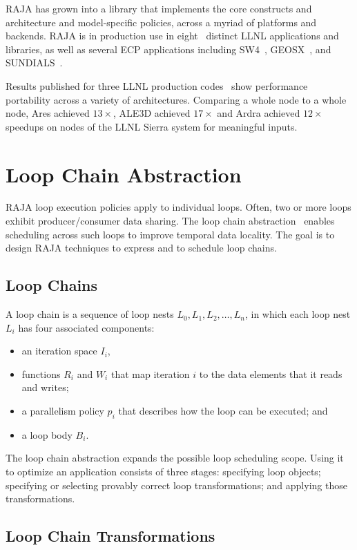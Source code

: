RAJA has grown into a library that implements the core constructs and
architecture and model-specific policies, across a myriad of platforms and
backends. RAJA is in production use in eight~\cite{raja-ecp-report} distinct
LLNL applications and libraries, as well as several ECP applications including
SW4~\cite{sw4}, GEOSX~\cite{geosx}, and SUNDIALS~\cite{sundials}.

Results published for three LLNL production codes~\cite{raja-p3hpc} show
performance portability across a variety of architectures.  Comparing a whole
node to a whole node, Ares achieved $13\times$, ALE3D achieved $17\times$ and
Ardra achieved $12\times$ speedups on nodes of the LLNL Sierra system for
meaningful inputs.


\section{Loop Chain Abstraction}\label{sec:loopchain}
RAJA loop execution policies apply to individual loops.
Often, two or more loops exhibit producer/consumer data sharing.
The loop chain abstraction~\cite{krieger2013loop} enables scheduling
across such loops to improve temporal data locality. 
The goal is to design RAJA techniques to express and to schedule loop chains.

\subsection{Loop Chains}

A loop chain is a sequence of loop nests $L_{0},L_{1},L_{2},\dots,L_{n}$,
in which each loop nest $L_{i}$ has four associated components:
\begin{itemize}
\item an iteration space $I_{i}$,
\item functions $R_{i}$ and $W_{i}$ that map iteration $i$ to the data 
      elements that it reads and writes;
\item a parallelism policy $p_{i}$ that describes how the loop can be executed; and
\item a loop body $B_{i}$.
\end{itemize} 

The loop chain abstraction expands the possible loop scheduling scope.
Using it to optimize an application consists of three stages:
specifying loop objects; specifying or selecting provably correct loop
transformations; and applying those transformations.

\subsection{Loop Chain Transformations}

